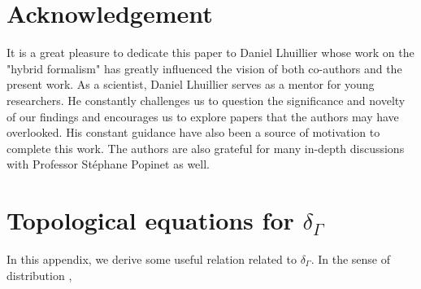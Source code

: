 \documentclass[11pt]{My_preprint}
\begin{document}
 




\section*{Acknowledgement}
It is a great pleasure to dedicate this paper to Daniel Lhuillier whose work on the "hybrid formalism" has greatly influenced the vision of both co-authors and the present work. 
As a scientist, Daniel Lhuillier serves as a mentor for young researchers. 
He constantly challenges us to question the significance and novelty of our findings and encourages us to explore papers that the authors may have overlooked.
His constant guidance have also been a source of motivation to complete this work.
The authors are also grateful for many in-depth discussions with Professor St\'ephane Popinet as well. 




\appendix

\section{Topological equations for $\delta_\Gamma$}
\label{ap:delta_I}
In this appendix, we derive some useful relation related to $\delta_\Gamma$. In the sense of distribution \citep{appel2007}, 
\end{document}

